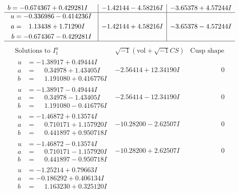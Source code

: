 \documentclass[1p]{elsarticle_modified}
\theoremstyle{definition}
\newcommand{\I}{\sqrt{-1}}
\begin{document}
$$\begin{array}{c|c|c}
\begin{aligned}
b &= -0.674367 + 0.429281 I\end{aligned}
 & -1.42144 - 4.58216 I & -3.65378 + 4.57244 I \\ \hline\begin{aligned}
u &= -0.336986 - 0.414236 I \\
a &= \phantom{-}1.13438 + 1.71290 I \\
b &= -0.674367 - 0.429281 I\end{aligned}
 & -1.42144 + 4.58216 I & -3.65378 - 4.57244 I\\
 \hline 
 \end{array}$$\newpage$$\begin{array}{c|c|c}  
\text{Solutions to }I^u_{1}& \I (\text{vol} + \sqrt{-1}CS) & \text{Cusp shape}\\
 \hline 
\begin{aligned}
u &= -1.38917 + 0.49444 I \\
a &= \phantom{-}0.34978 + 1.43405 I \\
b &= \phantom{-}1.191080 + 0.416776 I\end{aligned}
 & -2.56414 + 12.34190 I & \phantom{-0.000000 } 0 \\ \hline\begin{aligned}
u &= -1.38917 - 0.49444 I \\
a &= \phantom{-}0.34978 - 1.43405 I \\
b &= \phantom{-}1.191080 - 0.416776 I\end{aligned}
 & -2.56414 - 12.34190 I & \phantom{-0.000000 } 0 \\ \hline\begin{aligned}
u &= -1.46872 + 0.13574 I \\
a &= \phantom{-}0.710171 + 1.157920 I \\
b &= \phantom{-}0.441897 + 0.950718 I\end{aligned}
 & -10.28200 - 2.62507 I & \phantom{-0.000000 } 0 \\ \hline\begin{aligned}
u &= -1.46872 - 0.13574 I \\
a &= \phantom{-}0.710171 - 1.157920 I \\
b &= \phantom{-}0.441897 - 0.950718 I\end{aligned}
 & -10.28200 + 2.62507 I & \phantom{-0.000000 } 0 \\ \hline\begin{aligned}
u &= -1.25214 + 0.79663 I \\
a &= -0.186292 + 0.406134 I \\
b &= \phantom{-}1.163230 + 0.325120 I\end{aligned}

\end{array}$$
\end{document}
